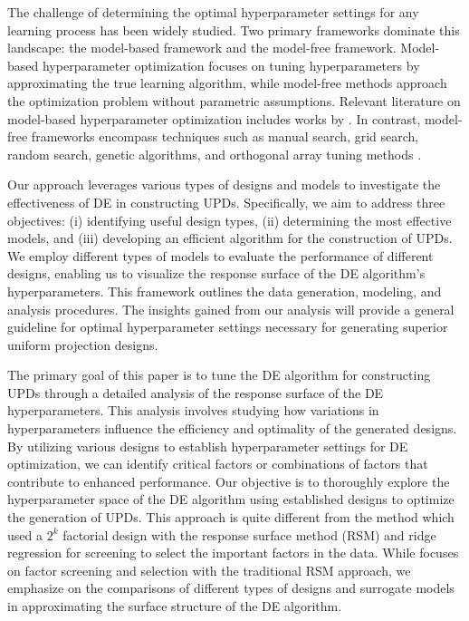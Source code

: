 \documentclass [PhD] {package/uclathes}
\begin{document}
The challenge of determining the optimal hyperparameter settings for any learning process has been widely studied. Two primary frameworks dominate this landscape: the model-based framework and the model-free framework. Model-based hyperparameter optimization focuses on tuning hyperparameters by approximating the true learning algorithm, while model-free methods approach the optimization problem without parametric assumptions. Relevant literature on model-based hyperparameter optimization includes works by \textcite{falkner2018bohb, hutter2011sequential, li2018hyperband, lujan2018design, mockus1978application, snoek2012practical, wu2020efficient, zoph2016neural}. In contrast, model-free frameworks encompass techniques such as manual search, grid search, random search, genetic algorithms, and orthogonal array tuning methods \parencite{liashchynskyi2019grid}.

Our approach leverages various types of designs and models to investigate the effectiveness of DE in constructing UPDs. Specifically, we aim to address three  objectives: (i) identifying useful design types, (ii) determining the most effective models, and (iii) developing an efficient algorithm for the construction of UPDs. We employ {different types of models} to evaluate the performance of different designs, enabling us to visualize the response surface of the DE algorithm's hyperparameters. This framework outlines the data generation, modeling, and analysis procedures. The insights gained from our analysis will provide a general guideline for optimal hyperparameter settings necessary for generating superior uniform projection designs.

The primary goal of this paper is to tune the DE algorithm for constructing UPDs through a detailed analysis of the response surface of the DE hyperparameters. This analysis involves studying how variations in hyperparameters influence the efficiency and optimality of the generated designs. By utilizing various designs to establish hyperparameter settings for DE optimization, we can identify critical factors or combinations of factors that contribute to enhanced performance. Our objective is to thoroughly explore the hyperparameter space of the DE algorithm using established designs to optimize the generation of UPDs. This approach is quite different from the \textcite{lujan2018design} method which used a $2^k$ factorial design with the response surface method (RSM) and ridge regression for screening to select the important factors in the data. While \textcite{lujan2018design} focuses on factor screening and selection with the traditional RSM approach, we emphasize on the comparisons of different types of designs and surrogate models in approximating the surface structure of the DE algorithm.
\end{document}
